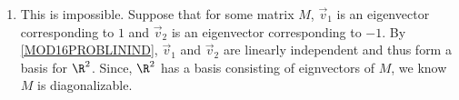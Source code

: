 \begin{exercises}
\begin{problist}
\begin{solution}
\begin{enumerate}
				\item This is impossible. Suppose that for some matrix $M$, $\vec v_{1}$
					is an eigenvector corresponding to $1$ and $\vec v_{2}$ is an eigenvector
					corresponding to $-1.$ By \ref{MOD16PROBLININD}, $\vec v_{1}$ and $\vec v_{2}$
					are linearly independent and thus form a basis for $\R^{2}$.
					Since, $\R^{2}$ has a basis consisting of eignvectors of $M$,
					we know $M$ is diagonalizable.
			\end{enumerate}
		\end{solution}
	\end{problist}
\end{exercises}
